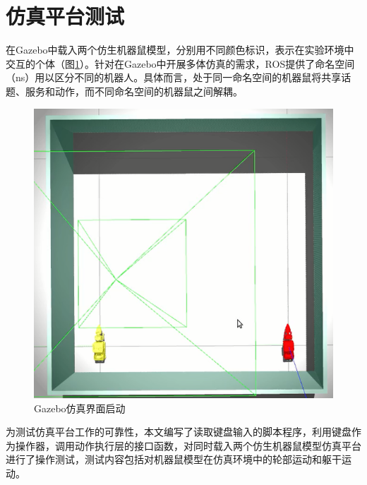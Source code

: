 \section{仿真平台测试 }
在Gazebo中载入两个仿生机器鼠模型，分别用不同颜色标识，表示在实验环境中交互的个体（图\ref{figure_setup}）。针对在Gazebo中开展多体仿真的需求，ROS提供了命名空间（ns）用以区分不同的机器人。具体而言，处于同一命名空间的机器鼠将共享话题、服务和动作，而不同命名空间的机器鼠之间解耦。
\begin{figure}[htb]
  \centering
  \includegraphics[width=0.5\linewidth]{images/ch03/setup.png}
  \caption{Gazebo仿真界面启动}\label{figure_setup}
\end{figure}

为测试仿真平台工作的可靠性，本文编写了读取键盘输入的脚本程序，利用键盘作为操作器，调用动作执行层的接口函数，对同时载入两个仿生机器鼠模型仿真平台进行了操作测试，测试内容包括对机器鼠模型在仿真环境中的轮部运动和躯干运动。

